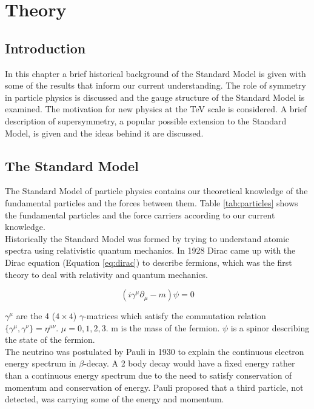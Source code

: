 \chapter{Theory}

\section{Introduction}

In this chapter a brief historical background of the Standard Model is given
with some of the results that inform our current understanding. The role of
symmetry in particle physics is discussed and the gauge structure of the
Standard Model is examined. The motivation for new physics at the TeV scale is
considered. A brief description of supersymmetry, a popular possible extension 
to the Standard Model, is given and the ideas behind it are discussed.

\section{The Standard Model}

The Standard Model of particle physics contains our theoretical knowledge of the
fundamental particles and the forces between them. Table \ref{tab:particles}
shows the fundamental particles and the force carriers according to our current
knowledge. \\

Historically the Standard Model was formed by trying to understand atomic
spectra using relativistic quantum mechanics. In 1928 Dirac came up with the
Dirac equation (Equation \ref{eq:dirac}) to describe fermions, which was the 
first theory to deal with relativity and quantum mechanics. 

\begin{equation}
\left(i\gamma^{\mu}\partial_{\mu} - m\right)\psi = 0
\label{eq:dirac}
\end{equation}

$\gamma^{\mu}$ are the 4 ($4\times4$) $\gamma$-matrices which satisfy the 
commutation relation $\{\gamma^{\mu},\gamma^{\nu}\} = \eta^{\mu\nu}$. $\mu = 0, 1,
2, 3$. m is the mass of the fermion. $\psi$ is a spinor describing the state of
the fermion. \\

The neutrino was postulated by Pauli in 1930 to explain the continuous electron 
energy spectrum in $\beta$-decay. A 2 body decay would have a fixed energy
rather than a continuous energy spectrum due to the need to satisfy conservation
of momentum and conservation of energy. Pauli proposed that a third particle,
not detected, was carrying some of the energy and momentum. \\


